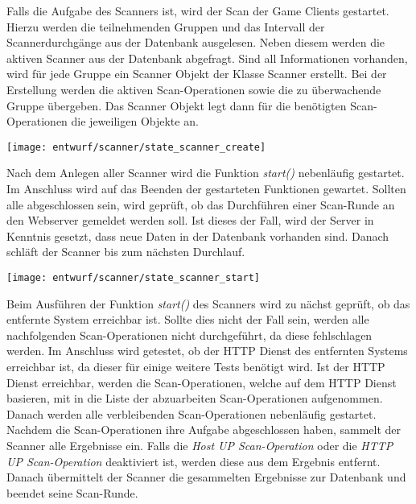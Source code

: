 Falls die Aufgabe des Scanners  ist, wird der Scan der Game Clients gestartet. Hierzu werden die teilnehmenden Gruppen und das Intervall der Scannerdurchgänge aus der Datenbank ausgelesen. Neben diesem werden die aktiven Scanner aus der Datenbank abgefragt. Sind all Informationen vorhanden, wird für jede Gruppe ein Scanner Objekt der Klasse Scanner erstellt. Bei der Erstellung werden die aktiven Scan-Operationen sowie die zu überwachende Gruppe übergeben. Das Scanner Objekt legt dann für die benötigten Scan-Operationen die jeweiligen Objekte an.

\begin{center}
	\texttt{[image: entwurf/scanner/state\_scanner\_create]}
	\label{fig:scanner-create-state}
\end{center}

Nach dem Anlegen aller Scanner wird die Funktion \textit{start()} nebenläufig gestartet. Im Anschluss wird auf das Beenden der gestarteten Funktionen gewartet. Sollten alle abgeschlossen sein, wird geprüft, ob das Durchführen einer Scan-Runde an den Webserver gemeldet werden soll. Ist dieses der Fall, wird der Server in Kenntnis gesetzt, dass neue Daten in der Datenbank vorhanden sind. Danach schläft der Scanner bis zum nächsten Durchlauf.

\begin{center}
	\texttt{[image: entwurf/scanner/state\_scanner\_start]}
\end{center}

Beim Ausführen der Funktion \textit{start()} des Scanners wird zu nächst geprüft, ob das entfernte System erreichbar ist. Sollte dies nicht der Fall sein, werden alle nachfolgenden Scan-Operationen nicht durchgeführt, da diese fehlschlagen werden. Im Anschluss wird getestet, ob der HTTP Dienst des entfernten Systems erreichbar ist, da dieser für einige weitere Tests benötigt wird. Ist der HTTP Dienst erreichbar, werden die Scan-Operationen, welche auf dem HTTP Dienst basieren, mit in die Liste der abzuarbeiten Scan-Operationen aufgenommen. Danach werden alle verbleibenden Scan-Operationen nebenläufig gestartet. Nachdem die Scan-Operationen ihre Aufgabe abgeschlossen haben, sammelt der Scanner alle Ergebnisse ein. Falls die \textit{Host UP Scan-Operation} oder die \textit{HTTP UP Scan-Operation} deaktiviert ist, werden diese aus dem Ergebnis entfernt. Danach übermittelt der Scanner die gesammelten Ergebnisse zur Datenbank und beendet seine Scan-Runde.


